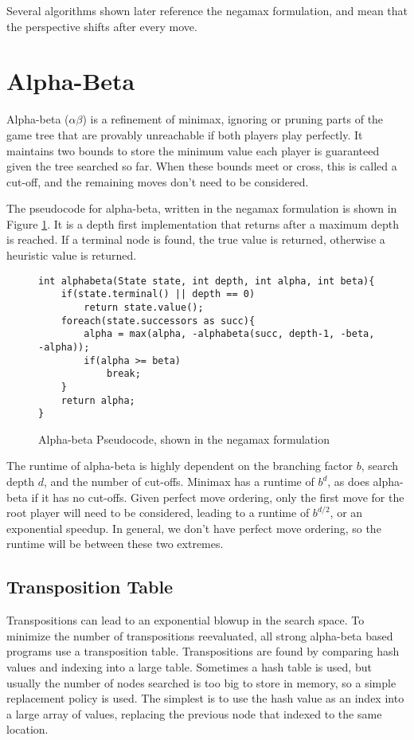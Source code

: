 Several algorithms shown later reference the negamax formulation, and mean that the perspective shifts after every move.


\section{Alpha-Beta}\label{sec:alphabeta}

Alpha-beta ($\alpha\beta$) is a refinement of minimax, ignoring or pruning parts of the game tree that are provably unreachable if both players play perfectly. It maintains two bounds to store the minimum value each player is guaranteed given the tree searched so far. When these bounds meet or cross, this is called a cut-off, and the remaining moves don't need to be considered.

The pseudocode for alpha-beta, written in the negamax formulation is shown in Figure \ref{fig:abcode}. It is a depth first implementation that returns after a maximum depth is reached. If a terminal node is found, the true value is returned, otherwise a heuristic value is returned.

\begin{figure}

\begin{lstlisting}
int alphabeta(State state, int depth, int alpha, int beta){
	if(state.terminal() || depth == 0)
		return state.value();
	foreach(state.successors as succ){
		alpha = max(alpha, -alphabeta(succ, depth-1, -beta, -alpha));
		if(alpha >= beta)
			break;
	}
	return alpha;
}
\end{lstlisting}

\caption{Alpha-beta Pseudocode, shown in the negamax formulation}
\label{fig:abcode}
\end{figure}

The runtime of alpha-beta is highly dependent on the branching factor $b$, search depth $d$, and the number of cut-offs. Minimax has a runtime of $b^d$, as does alpha-beta if it has no cut-offs. Given perfect move ordering, only the first move for the root player will need to be considered, leading to a runtime of $b^{d/2}$, or an exponential speedup. In general, we don't have perfect move ordering, so the runtime will be between these two extremes.

\subsection{Transposition Table}

Transpositions can lead to an exponential blowup in the search space. To minimize the number of transpositions reevaluated, all strong alpha-beta based programs use a transposition table. Transpositions are found by comparing hash values and indexing into a large table. Sometimes a hash table is used, but usually the number of nodes searched is too big to store in memory, so a simple replacement policy is used. The simplest is to use the hash value as an index into a large array of values, replacing the previous node that indexed to the same location.

